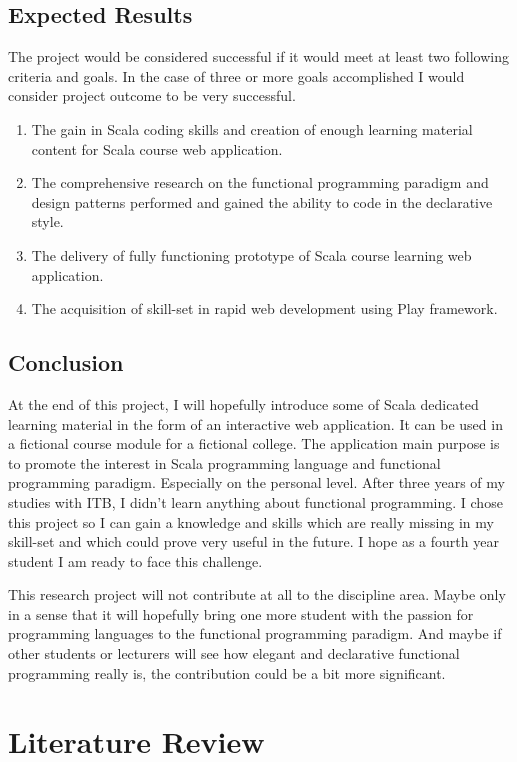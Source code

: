 \documentclass[12pt,twoside,a4paper]{report}
\begin{document}
\section{Expected Results}\label{1.8}
The project would be considered successful if it would meet at least two following criteria and goals. In the case of three or more goals accomplished I would consider project outcome to be very successful.
\begin{enumerate}\itemsep1pt \parskip0pt 
\item The gain in Scala coding skills and creation of enough learning material content for Scala course web application.
\item The comprehensive research on the functional programming paradigm and design patterns performed and gained the ability to code in the declarative style.
\item The delivery of fully functioning prototype of Scala course learning web application.
\item The acquisition of skill-set in rapid web development using Play framework.
\end{enumerate}
\section{Conclusion}\label{1.9}
At the end of this project, I will hopefully introduce some of Scala dedicated learning material in the form of an interactive web application. It can be used in a fictional course module for a fictional college. The application main purpose is to promote the interest in Scala programming language and functional programming paradigm. Especially on the personal level. After three years of my studies with ITB, I didn't learn anything about functional programming. I chose this project so I can gain a knowledge and skills which are really missing in my skill-set and which could prove very useful in the future. I hope as a fourth year student I am ready to face this challenge.\par
This research project will not contribute at all to the discipline area. Maybe only in a sense that it will hopefully bring one more student with the passion for programming languages to the functional programming paradigm. And maybe if other students or lecturers will see how elegant and declarative functional programming really is, the contribution could be a bit more significant.

\chapter{Literature Review}\label{2}
\end{document}
